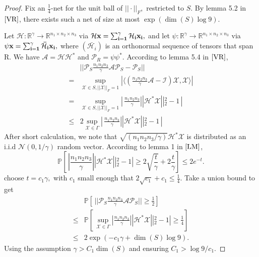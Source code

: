 \documentclass[journal,transmag]{IEEEtran}
\theoremstyle{plain}
\begin{document}
\begin{proof}
Fix an $\frac{1}{4}$-net for the unit ball of $||\cdot||_F,$ restricted to $S$. By lemma 5.2 in $\cite{VR}$, there exists such a net of size at most $\exp(\dim(S)\log9)$.

\noindent Let $\mathcal{H}:\mathbb{R}^{\gamma}\rightarrow \mathbb{R}^{n_1 \times n_2 \times n_3}$ via $\mathcal{H}\bf{x}=\sum^{\gamma}_{i=1}\mathcal{H}_i x_i,$ and let $\psi:\mathbb{R}^{\gamma}\rightarrow \mathbb{R}^{n_1\times n_2 \times n_3}$ via $\psi \bf{x}= \sum^{\gamma}_{i=1}\bar{\mathcal{H}_i} x_i,$ where $(\bar{\mathcal{H}_i})$ is an orthonormal sequence of tensors that span R. We have $\mathcal{A}=\mathcal{H}\mathcal{H}^*$ and $\mathcal{P}_R=\psi\psi^*.$ According to lemma 5.4 in $\cite{VR}$,
\begin{equation}
\begin{split}
&||\mathcal{P}_S \frac{n_1 n_2 n_3}{\gamma}\mathcal{A}\mathcal{P}_S-\mathcal{P}_S|| \\
=& \sup_{\mathcal{X}\in S,||\mathcal{X}||_F=1} |\langle(\frac{n_1 n_2 n_3}{\gamma}\mathcal{A}-\mathcal{I})\mathcal{X},\mathcal{X}\rangle| \\
=& \sup_{\mathcal{X}\in S,||\mathcal{X}||_F=1} |\,\frac{n_1 n_2 n_3}{\gamma}||\mathcal{H}^*\mathcal{X}||^2_2-1 \,| \\
\le &2\sup_{\mathcal{X}\in \Gamma} |\,\frac{n_1 n_2 n_3}{\gamma}||\mathcal{H}^*\mathcal{X}||^2_2-1 \,|
\end{split}
\end{equation}
After short calculation, we note that $\sqrt{(n_1 n_2 n_3/\gamma)}\mathcal{H}^*\mathcal{X}$ is distributed as an i.i.d $\mathcal{N}(0,1/\gamma)$ random vector. According to lemma 1 in $\cite{LM}$,
\begin{equation}
\mathbb{P}[\,|\frac{n_1 n_2 n_3}{\gamma}||\mathcal{H}^*\mathcal{X}||^2_2-1|\ge 2\sqrt{\frac{t}{\gamma}}+2\frac{t}{\gamma}]\le 2e^{-t}.
\end{equation}
choose $t=c_1 \gamma,$ with $c_1$ small enough that $2\sqrt{c_1}+c_1\le \frac{1}{4}.$ Take a union bound to get
\begin{equation}
\begin{split}
&\mathbb{P}[\,||\mathcal{P}_S \frac{n_1 n_2 n_3}{\gamma}\mathcal{A}\mathcal{P}_S||\ge\frac{1}{2}] \\
\le& \mathbb{P}[\, \sup_{\mathcal{X}\in\Gamma}|\frac{n_1 n_2 n_3}{\gamma}||\mathcal{H}^*\mathcal{X}||^2_2-1|\ge \frac{1}{4}] \\
\le& 2\exp(-c_1 \gamma +\dim(S)\log9).
\end{split}
\end{equation}
Using the assumption $\gamma>C_1 \dim(S)$ and ensuring $C_1 >\log 9/c_1$.


\end{proof}
\end{document}
